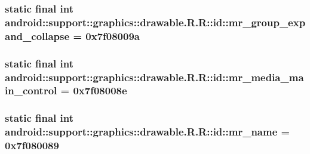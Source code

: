 \hypertarget{classandroid_1_1support_1_1graphics_1_1drawable_1_1_r_1_1id_615dd3e5133a24f7caa1ee161c69beb0}{
\subsubsection[{mr\_\-group\_\-expand\_\-collapse}]{\setlength{\rightskip}{0pt plus 5cm}static final int android::support::graphics::drawable.R.R::id::mr\_\-group\_\-expand\_\-collapse = 0x7f08009a}}
\label{classandroid_1_1support_1_1graphics_1_1drawable_1_1_r_1_1id_615dd3e5133a24f7caa1ee161c69beb0}


\hypertarget{classandroid_1_1support_1_1graphics_1_1drawable_1_1_r_1_1id_7732016733e5530b3d691d55f4920cf1}{
\subsubsection[{mr\_\-media\_\-main\_\-control}]{\setlength{\rightskip}{0pt plus 5cm}static final int android::support::graphics::drawable.R.R::id::mr\_\-media\_\-main\_\-control = 0x7f08008e}}
\label{classandroid_1_1support_1_1graphics_1_1drawable_1_1_r_1_1id_7732016733e5530b3d691d55f4920cf1}


\hypertarget{classandroid_1_1support_1_1graphics_1_1drawable_1_1_r_1_1id_0822ac757e3b867ee015d60c9bac01fa}{
\subsubsection[{mr\_\-name}]{\setlength{\rightskip}{0pt plus 5cm}static final int android::support::graphics::drawable.R.R::id::mr\_\-name = 0x7f080089}}
\label{classandroid_1_1support_1_1graphics_1_1drawable_1_1_r_1_1id_0822ac757e3b867ee015d60c9bac01fa}


